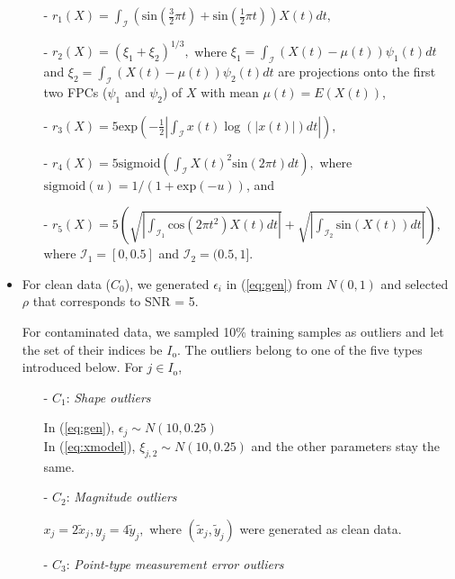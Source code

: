 \documentclass{article}
\let\oldref\ref
\renewcommand{\ref}[1]{(\oldref{#1})}
\begin{document}
\begin{itemize}
\begin{itemize}
\item[- ]  $r_1(X) =  \int_{\mathcal{I}} \left (\text{sin} \left(\frac{3}{2} \pi t \right) +  \text{sin} \left(\frac{1}{2} \pi t \right)\right)X(t)dt,$
\item[- ]  $r_2(X) = (\xi_1 + \xi_2)^{1/3},$ where  $\xi_1 = \int_{\mathcal{I}} (X(t) - \mu(t))\psi_1(t) dt$ and $\xi_2 = \int_{\mathcal{I}} (X(t) - \mu(t))\psi_2(t) dt$ are projections onto the first two FPCs ($\psi_1$ and $\psi_2$) of $X$ with mean $\mu(t) = E(X(t))$, 
\item[- ]  $r_3(X) = 5\text{exp}\left (- \frac{1}{2}\left| \int_{\mathcal{I}} x(t)\log(|x(t)|)dt \right| \right),$
\item[- ] 
$r_4(X) = 5\text{sigmoid}\left(\int_{\mathcal{I}}X(t)^2 \text{sin}(2\pi t) dt \right),$ where  $\text{sigmoid}(u) = 1/(1+ \text{exp}(-u))$, and
\item[- ] 
$r_5(X) = 5 \left( \sqrt{\left|\int_{\mathcal{I}_1} \text{cos}(2\pi t^2) X(t) dt \right|} + \sqrt{\left|\int_{\mathcal{I}_2} \text{sin}(X(t)) dt \right|} \right), $ where  $\mathcal{I}_1 = [0,0.5]$ and $\mathcal{I}_2 = (0.5,1]$. 
\end{itemize}

\item For clean data ($C_0$), we generated $\epsilon_i$ in \ref{eq:gen} from $N(0,1)$ and selected $\rho$ that corresponds to SNR = 5. 

For contaminated data, we sampled 10\% training samples as outliers and let the set of their indices be $I_{\text{o}}$. The outliers belong to  one of the five types introduced below. For $j \in I_{\text{o}}$, 
\begin{itemize}
    \item[- ] $C_1$: \textit{Shape outliers}
    
    \vspace{1ex}
    In \ref{eq:gen}, $\epsilon_j \sim N(10, 0.25)$ \\
    In \ref{eq:xmodel},   $\xi_{j,2} \sim N(10, 0.25)$ and the other parameters stay the same.  
       \vspace{1ex}
    \item[- ] $C_2$: \textit{Magnitude outliers}     \vspace{1ex}
    
    $x_{j} = 2 \tilde{x}_{j}, y_{j} =  4 \tilde{y}_{j},$ where $(\tilde{x}_j, \tilde{y}_j)$ were generated as clean data.
       \vspace{1ex}
    \item[- ] $C_3$: \textit{Point-type measurement error outliers} 
    

\end{itemize}
\end{itemize}
\end{document}

